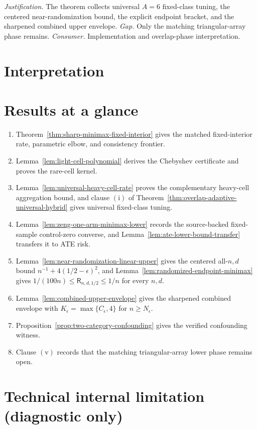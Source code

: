 \documentclass{article}
\begin{document}
\par\smallskip\noindent \textit{Justification.} The theorem collects universal \(A=6\) fixed-class tuning, the centered near-randomization bound, the explicit endpoint bracket, and the sharpened combined upper envelope. \textit{Gap.} Only the matching triangular-array phase remains. \textit{Consumer.} Implementation and overlap-phase interpretation.

\section{Interpretation}

\section{Results at a glance}\begin{enumerate}\item Theorem~\ref{thm:sharp-minimax-fixed-interior} gives the matched fixed-interior rate, parametric elbow, and consistency frontier.\item Lemma~\ref{lem:light-cell-polynomial} derives the Chebyshev certificate and proves the rare-cell kernel.\item Lemma~\ref{lem:universal-heavy-cell-rate} proves the complementary heavy-cell aggregation bound, and clause \(\mathrm{(i)}\) of Theorem~\ref{thm:overlap-adaptive-universal-hybrid} gives universal fixed-class tuning.\item Lemma~\ref{lem:zeng-one-arm-minimax-lower} records the source-backed fixed-sample control-zero converse, and Lemma~\ref{lem:ate-lower-bound-transfer} transfers it to ATE risk.\item Lemma~\ref{lem:near-randomization-linear-upper} gives the centered all-\(n,d\) bound \(n^{-1}+4(1/2-\epsilon)^2\), and Lemma~\ref{lem:randomized-endpoint-minimax} gives \(1/(100n)\le\mathsf R_{n,d,1/2}\le1/n\) for every \(n,d\).\item Lemma~\ref{lem:combined-upper-envelope} gives the sharpened combined envelope with \(K_\epsilon=\max\{C_\epsilon,4\}\) for \(n\ge N_\epsilon\).\item Proposition~\ref{prop:two-category-confounding} gives the verified confounding witness.\item Clause \(\mathrm{(v)}\) records that the matching triangular-array lower phase remains open.\end{enumerate}

\section*{Technical internal limitation (diagnostic only)}
\end{document}
